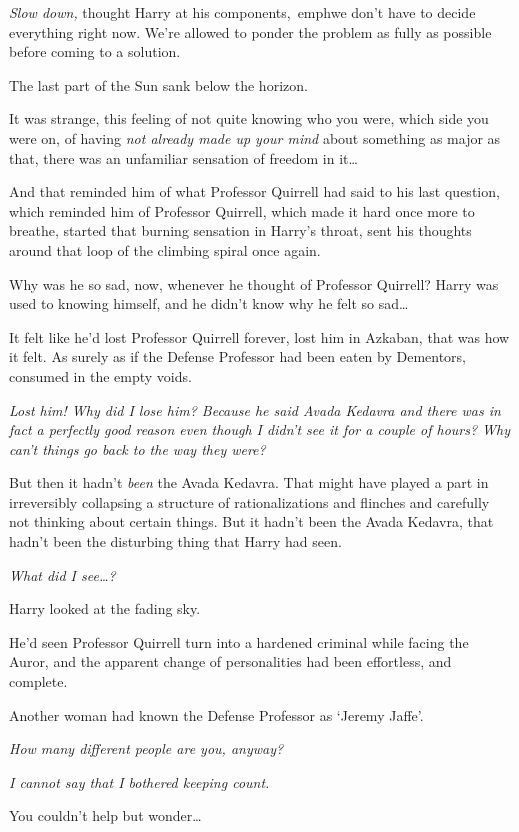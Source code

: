 \emph{Slow down,} thought Harry at his components,\ emph{we don't have to 
decide everything right now. We're allowed to ponder the problem as fully as 
possible before coming to a solution.}

The last part of the Sun sank below the horizon.

It was strange, this feeling of not quite knowing who you were, which side you 
were on, of having \emph{not already made up your mind} about something as 
major as that, there was an unfamiliar sensation of freedom in it{\ldots}

And that reminded him of what Professor Quirrell had said to his last question, 
which reminded him of Professor Quirrell, which made it hard once more to 
breathe, started that burning sensation in Harry's throat, sent his thoughts 
around that loop of the climbing spiral once again.

Why was he so sad, now, whenever he thought of Professor Quirrell? Harry was 
used to knowing himself, and he didn't know why he felt so sad{\ldots}

It felt like he'd lost Professor Quirrell forever, lost him in Azkaban, that 
was how it felt. As surely as if the Defense Professor had been eaten by 
Dementors, consumed in the empty voids.

\emph{Lost him! Why did I lose him? Because he said Avada Kedavra and there was 
in fact a perfectly good reason even though I didn't see it for a couple of 
hours? Why can't things go back to the way they were?}

But then it hadn't \emph{been} the Avada Kedavra. That might have played a part 
in irreversibly collapsing a structure of rationalizations and flinches and 
carefully not thinking about certain things. But it hadn't been the Avada 
Kedavra, that hadn't been the disturbing thing that Harry had seen.

\emph{What did I see{\ldots}?}

Harry looked at the fading sky.

He'd seen Professor Quirrell turn into a hardened criminal while facing the 
Auror, and the apparent change of personalities had been effortless, and 
complete.

Another woman had known the Defense Professor as `Jeremy Jaffe'.

\emph{How many different people are you, anyway?}

\emph{I cannot say that I bothered keeping count.}

You couldn't help but wonder{\ldots}


